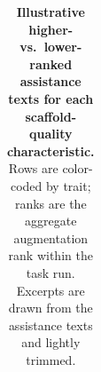 \begin{table}[htbp]
\begin{tabularx}{\linewidth}{
    >{\raggedright\arraybackslash}p{1.0cm}
    >{\raggedright\arraybackslash}p{3.0cm}
    >{\raggedright\arraybackslash}X}
\bottomrule
\end{tabularx}
\caption{\textbf{Illustrative higher- vs.\ lower-ranked assistance texts for each
scaffold-quality characteristic.} Rows are color-coded by trait; ranks are the aggregate
augmentation rank within the task run. Excerpts are drawn from the assistance texts and lightly trimmed.}
\label{tab:trait-examples}
\end{table}
